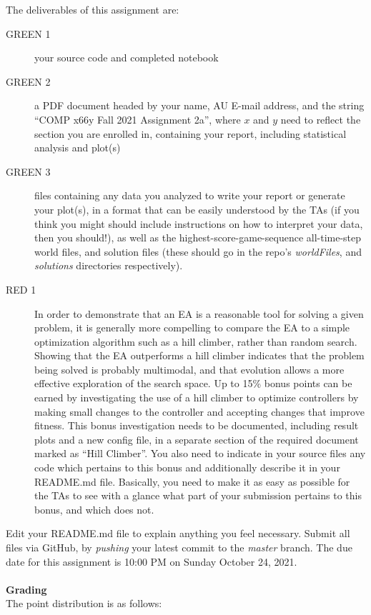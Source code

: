 \documentclass{article}
\begin{document}
The deliverables of this assignment are:
\begin{description}
\item[GREEN 1] your source code and completed notebook
\item[GREEN 2] a PDF document headed by your name, AU E-mail address, and the string ``COMP x66y Fall 2021 Assignment 2a'', where $x$ and $y$ need to reflect the section you are enrolled in, containing your report, including statistical analysis and plot(s)
\item[GREEN 3] files containing any data you analyzed to write your report or generate your plot(s), in a format that can be easily understood by the TAs (if you think you might should include instructions on how to interpret your data, then you should!), as well as the highest-score-game-sequence all-time-step world files, and solution files (these should go in the repo's \emph{worldFiles}, and \emph{solutions} directories respectively).
\item[RED 1] In order to demonstrate that an EA is a reasonable tool for solving a given problem, it is generally more compelling to compare the EA to a simple optimization algorithm such as a hill climber, rather than random search. Showing that the EA outperforms a hill climber indicates that the problem being solved is probably multimodal, and that evolution allows a more effective exploration of the search space. Up to 15\% bonus points can be earned by investigating the use of a hill climber to optimize controllers by making small changes to the controller and accepting changes that improve fitness. This bonus investigation needs to be documented, including result plots and a new config file, in a separate section of the required document marked as ``Hill Climber''. You also need to indicate in your source files any code which pertains to this bonus and additionally describe it in your README.md file. Basically, you need to make it as easy as possible for the TAs to see with a glance what part of your submission pertains to this bonus, and which does not.
\end{description}
Edit your README.md file to explain anything you feel necessary. Submit all files via GitHub, by \emph{pushing} your latest commit to the \emph{master} branch. The due date for this assignment is 10:00 PM on Sunday October 24, 2021.
\\
\\
\textbf{Grading}\\
The point distribution is as follows:\\
\end{document}

